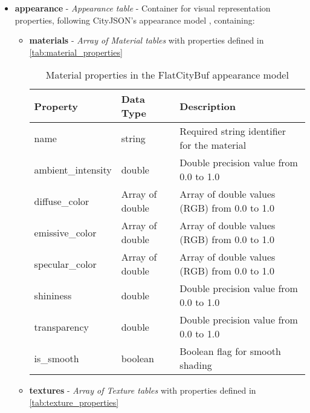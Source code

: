 \begin{itemize}
  \item \textbf{appearance} - \textit{Appearance table} - Container for visual representation properties, following CityJSON's appearance model \citep{cityjson_spec}, containing:
    \begin{itemize}
      \item \textbf{materials} - \textit{Array of Material tables} with properties defined in \autoref{tab:material_properties}

        \begin{table}[h]
          \centering
          \caption{Material properties in the FlatCityBuf appearance model}
          \label{tab:material_properties}
          \begin{tabular}{@{}lll@{}}
            \toprule
            \textbf{Property} & \textbf{Data Type} & \textbf{Description} \\
            \midrule
            name & string & Required string identifier for the material \\
            ambient\_intensity & double & Double precision value from 0.0 to 1.0 \\
            diffuse\_color & Array of double & Array of double values (RGB) from 0.0 to 1.0 \\
            emissive\_color & Array of double & Array of double values (RGB) from 0.0 to 1.0 \\
            specular\_color & Array of double & Array of double values (RGB) from 0.0 to 1.0 \\
            shininess & double & Double precision value from 0.0 to 1.0 \\
            transparency & double & Double precision value from 0.0 to 1.0 \\
            is\_smooth & boolean & Boolean flag for smooth shading \\
            \bottomrule
          \end{tabular}
        \end{table}

      \item \textbf{textures} - \textit{Array of Texture tables} with properties defined in \autoref{tab:texture_properties}


\end{itemize}
\end{itemize}
